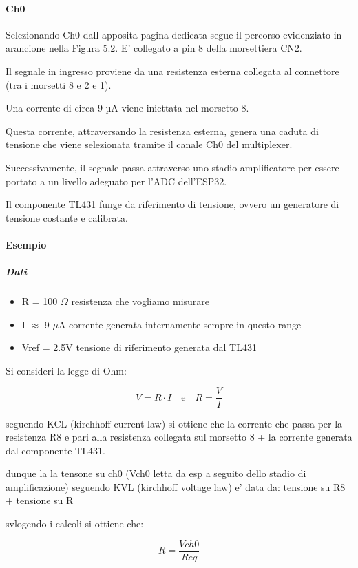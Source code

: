\documentclass[12pt,a4paper]{report}
\begin{document}
\paragraph{Ch0}
Selezionando Ch0 dall apposita pagina dedicata segue il percorso evidenziato in arancione nella Figura 5.2.
E' collegato a pin 8 della morsettiera CN2.

Il segnale in ingresso proviene da una resistenza esterna collegata al connettore (tra i morsetti 8 e 2 e 1). 

Una corrente di circa 9 µA viene iniettata nel morsetto 8. 

Questa corrente, attraversando la resistenza esterna, genera una caduta di tensione che viene selezionata tramite il canale Ch0 del multiplexer. 

Successivamente, il segnale passa attraverso uno stadio amplificatore per essere portato a un livello adeguato per l'ADC dell'ESP32.

Il componente TL431 funge da riferimento di tensione, ovvero un generatore di tensione costante e calibrata.

\paragraph{Esempio } 
\subparagraph{Dati}

\begin{itemize}
    \item R = 100 $\Omega$ resistenza che vogliamo misurare
    \item I $\approx$ 9 $\mu$A corrente generata internamente sempre in questo range
    \item Vref = 2.5V tensione di riferimento generata dal TL431
\end{itemize}

Si consideri la legge di Ohm:

\[ V = R \cdot I \quad \text{e} \quad R = \frac{V}{I} \]

seguendo KCL (kirchhoff current law) si ottiene che la corrente che passa per la resistenza R8 e pari alla resistenza collegata sul morsetto 8 + la corrente generata dal componente TL431.

dunque la la tensone su ch0 (Vch0 letta da esp a seguito dello stadio di amplificazione) seguendo KVL (kirchhoff voltage law) e' data da: tensione su R8 + tensione su R

svlogendo i calcoli si ottiene che:

\[ R = \frac{Vch0}{Req}  \] 
\end{document}
